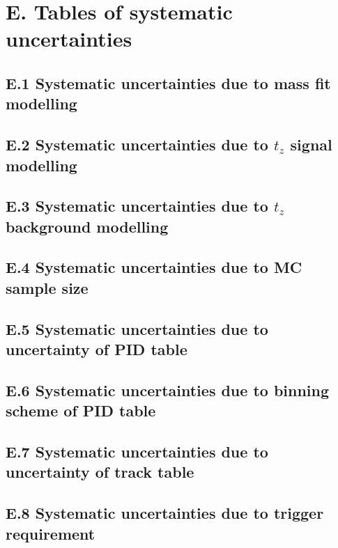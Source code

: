 \clearpage
\section*{E. Tables of systematic uncertainties}
\label{SYSERR_APPENDIX}
\clearpage
\subsection*{E.1 Systematic uncertainties due to mass fit modelling}





\clearpage
\subsection*{E.2 Systematic uncertainties due to $t_z$ signal modelling}





\clearpage
\subsection*{E.3 Systematic uncertainties due to $t_z$ background modelling}





\clearpage
\subsection*{E.4 Systematic uncertainties due to MC sample size}





\clearpage
\subsection*{E.5 Systematic uncertainties due to uncertainty of PID table}





\clearpage
\subsection*{E.6 Systematic uncertainties due to binning scheme of PID table}





\clearpage
\subsection*{E.7 Systematic uncertainties due to uncertainty of track table}





\clearpage
\subsection*{E.8 Systematic uncertainties due to trigger requirement}





